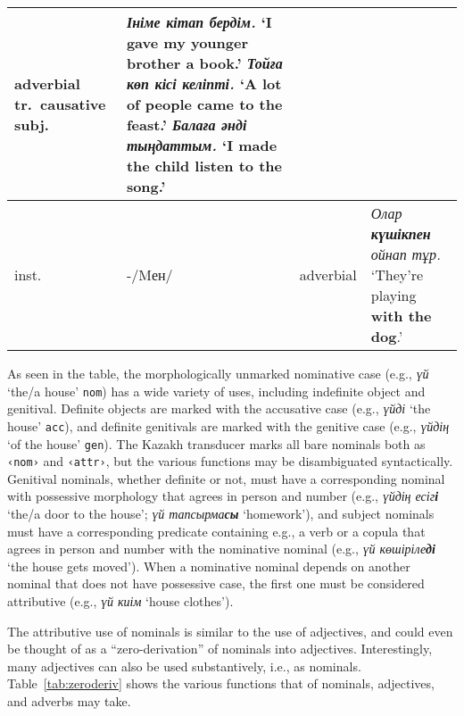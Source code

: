 \documentclass[a4paper,11pt, onecolumn,twoside]{article}
\newcommand{\gmk}[1]{{\rm {\sc \texttt{#1}}}}
\newcommand{\kazakh}[1]{{\em #1}}
\newcommand{\gloss}[1]{`#1'}
\newcommand{\tag}[1]{\texttt{‹#1›}}
\begin{document}
\begin{table}[htbp]
\begin{small}
\begin{tabular}{l l p{8em} p{27.15em}}
										adverbial\newline
										tr.\ causative subj.%
									& \kazakh{\textbf{Ініме} кітап бердім.} \gloss{I gave \textbf{my younger brother} a book.} \newline
										\kazakh{\textbf{Тойға} көп кісі келіпті.} \gloss{A lot of people came \textbf{to the feast.}}\newline
										\kazakh{\textbf{Балаға} әнді тыңдаттым.} \gloss{I made \textbf{the child} listen to the song.}
										\\\midrule
				inst. & -/Mен/ &  adverbial & \kazakh{Олар \textbf{күшікпен} ойнап тұр.} \gloss{They're playing \textbf{with the dog}.} \\
			\bottomrule
		\end{tabular}
	\end{small}
\end{table}

As seen in the table, the morphologically unmarked nominative case (e.g., \kazakh{үй} \gloss{the/a house} \gmk{nom}) has a wide variety of uses, including indefinite object and genitival.  Definite objects are marked with the accusative case (e.g., \kazakh{үйді} \gloss{the house} \gmk{acc}), and definite genitivals are marked with the genitive case (e.g., \kazakh{үйдің} \gloss{of the house} \gmk{gen}).  The Kazakh transducer marks all bare nominals both as \tag{nom} and \tag{attr}, but the various functions may be disambiguated syntactically.  Genitival nominals, whether definite or not, must have a corresponding nominal with possessive morphology that agrees in person and number (e.g., \kazakh{үйдің есіг\textbf{і}} \gloss{the/a door to the house}; \kazakh{үй тапсырма\textbf{сы}} \gloss{homework}), and subject nominals must have a corresponding predicate containing e.g., a verb or a copula that agrees in person and number with the nominative nominal (e.g., \kazakh{үй көшіріле\textbf{ді}} \gloss{the house gets moved}).  When a nominative nominal depends on another nominal that does not have possessive case, the first one must be considered attributive (e.g., \kazakh{үй киім} \gloss{house clothes}).

The attributive use of nominals is similar to the use of adjectives, and could even be thought of as a ``zero-derivation'' of nominals into adjectives.  Interestingly, many adjectives can also be used substantively, i.e., as nominals.  Table~\ref{tab:zeroderiv} shows the various functions that of nominals, adjectives, and adverbs may take.
\end{document}
